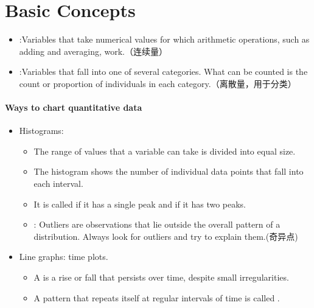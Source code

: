 \section{Basic Concepts}
\begin{definition}[variable]
    \begin{itemize}
        \item {}:Variables that take numerical values for which arithmetic operations, such as adding and averaging, work.（连续量）
        \item {}:Variables that fall into one of several categories. What can be counted is the count or proportion of individuals in each category.（离散量，用于分类）


    \end{itemize}
\end{definition}
\paragraph{Ways to chart  quantitative data}

\begin{itemize}
    \item Histograms: \begin{itemize}
        \item The range of values that a variable can take is divided into equal size.
        \item The histogram shows the number of individual data points that fall into each interval.
        \item It is  called  if it has a single peak and  if it has two peaks.
        \item {}: Outliers are observations that lie outside the overall pattern of a distribution. Always look for outliers and try to explain them.(奇异点)

    \end{itemize}
    \item Line graphs: time plots.
    \begin{itemize}
        \item A  is a rise or fall that persists over time, despite small irregularities.
        \item A pattern that repeats itself at regular intervals of time is called .
    \end{itemize}
\end{itemize}